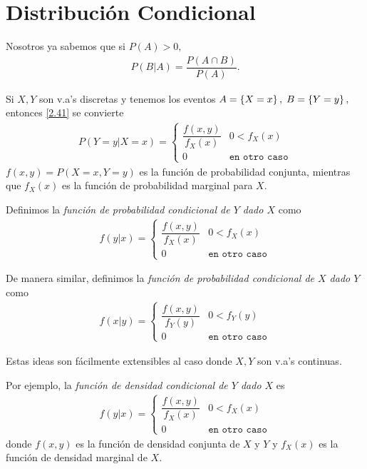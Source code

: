 \section{Distribución Condicional}

 Nosotros ya sabemos que si $P(A)>0,$
 \begin{align}
  \label{2.41}
  P(B|A)=\dfrac{P(A\cap B)}{P(A)}.
 \end{align}



 Si $X,Y$ son v.a's discretas y tenemos los eventos $A=\left\{ X=x \right\}, \; B=\left\{ Y=y \right\},$ entonces \eqref{2.41} se convierte
 \begin{align}
  \label{2.42}
  P(Y=y|X=x)=
  \begin{cases}
   \dfrac{f(x,y)}{f_{X}(x)} & 0 < f_{X}(x)  \\
   0 & \texttt{en otro caso}
  \end{cases}
 \end{align}
 $f(x,y)=P(X=x,Y=y)$ es la función de probabilidad conjunta, mientras que $f_{X}(x)$ es la función de probabilidad marginal para $X.$


 Definimos la \emph{función de probabilidad condicional de $Y$ dado $X$} como
 \begin{align}
  \label{2.43}
  f(y|x)=
  \begin{cases}
   \dfrac{f(x,y)}{f_{X}(x)} & 0 < f_{X}(x)  \\
   0 & \texttt{en otro caso}
  \end{cases}
 \end{align}



 De manera similar, definimos la \emph{función de probabilidad condicional de $X$ dado $Y$} como
 \begin{align}
  \label{2.44}
  f(x|y)=
  \begin{cases}
   \dfrac{f(x,y)}{f_{Y}(y)} & 0 < f_{Y}(y)  \\
   0 & \texttt{en otro caso}
  \end{cases}
 \end{align}


 Estas ideas son fácilmente extensibles al caso donde $X,Y$ son v.a's continuas.


 Por ejemplo, la \emph{función de densidad condicional de $Y$ dado $X$} es
 \begin{align}
  \label{2.45}
  f(y|x)=
    \begin{cases}
   \dfrac{f(x,y)}{f_{X}(x)} & 0 < f_{X}(x)  \\
   0 & \texttt{en otro caso}
  \end{cases}
 \end{align}
 donde $f(x,y)$ es la función de densidad conjunta de $X$ y $Y$ y $f_{X}(x)$ es la función de densidad marginal de $X.$


